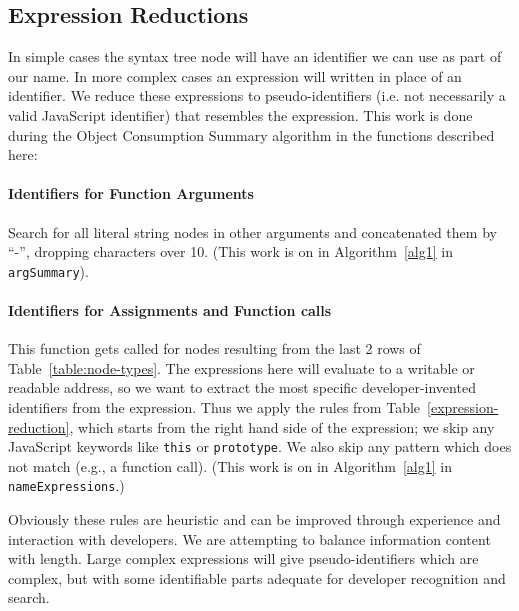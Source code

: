 \documentclass[10pt, preprint]{sigplanconf}
\begin{document}
\subsection{Expression Reductions}
\label{sec:general-element-naming}

In simple cases the syntax tree node will have an identifier we can use as part of our name. In more complex cases an expression will written in place of an identifier. We reduce these expressions to pseudo-identifiers (i.e. not necessarily a valid JavaScript identifier) that resembles the expression. This work is done during the Object Consumption Summary algorithm in the functions described here:
\paragraph{Identifiers for Function Arguments} Search for all literal string nodes in other arguments and concatenated them by ``-'', dropping  characters over 10.  
 (This work is on in Algorithm~\ref{alg1} in \verb|argSummary|).
\paragraph{Identifiers for Assignments and Function calls} This function gets called for nodes resulting from the last 2 rows of Table~\ref{table:node-types}. The expressions here will evaluate to a writable or readable address, so we want to extract the most specific developer-invented identifiers from the expression. Thus we apply the rules from Table~\ref{expression-reduction}, which starts from the right hand side of the expression; we skip any JavaScript keywords like \texttt{this} or \texttt{prototype}. We also skip any pattern which does not match (e.g., a function call). (This work is on in Algorithm~\ref{alg1} in \verb|nameExpressions|.)

Obviously these rules are heuristic and can be improved through experience and interaction with developers. We are attempting to balance information content with length. Large complex expressions will give pseudo-identifiers which are complex, but with some identifiable parts adequate for developer recognition and search.
\end{document}
